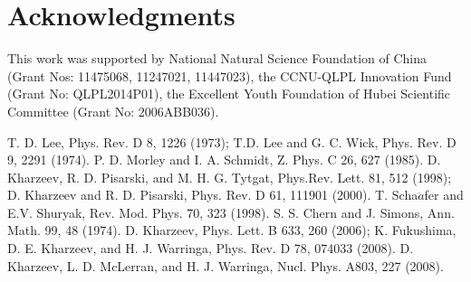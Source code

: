 \documentclass[twocolumn,showpacs,preprintnumbers,amsmath,amssymb]{revtex4}
\begin{document}
\section{Acknowledgments}
This work was supported by National Natural Science Foundation of China (Grant Nos: 11475068, 11247021, 11447023), the CCNU-QLPL Innovation Fund (Grant No: QLPL2014P01),
the Excellent Youth Foundation of Hubei Scientific Committee (Grant No: 2006ABB036).


\begin{thebibliography}{}
 T. D. Lee, Phys. Rev. D 8, 1226 (1973); T.D. Lee and G. C. Wick, Phys. Rev. D 9, 2291 (1974).
 P. D. Morley and I. A. Schmidt, Z. Phys. C 26, 627 (1985).
 D. Kharzeev, R. D. Pisarski, and M. H. G. Tytgat, Phys.Rev. Lett. 81, 512 (1998); D. Kharzeev and R. D. Pisarski,
Phys. Rev. D 61, 111901 (2000).
 T. Scha$\ddot{a}$fer and E.V. Shuryak, Rev. Mod. Phys. 70, 323 (1998).
 S. S. Chern and J. Simons, Ann. Math. 99, 48 (1974).
 D. Kharzeev, Phys. Lett. B 633, 260 (2006); K. Fukushima, D. E. Kharzeev, and H. J. Warringa, Phys.
Rev. D 78, 074033 (2008).
 D. Kharzeev, L. D. McLerran, and H. J. Warringa, Nucl. Phys. A803, 227 (2008).



\end{thebibliography}
\end{document}
